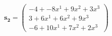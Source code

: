 \documentclass[preview]{standalone}
\begin{document}
\begin{align*}
\mathbf{s_2} = \begin{pmatrix}-4 + -8x^{1} + 9x^{2} + 3x^{3} \\ 3 + 6x^{1} + 6x^{2} + 9x^{3} \\ -6 + 10x^{1} + 7x^{2} + 2x^{3}\end{pmatrix}
\end{align*}
\end{document}
